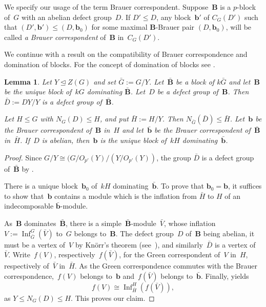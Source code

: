 \documentclass[12pt]{amsart}
\newcommand{\bB}{{\mathbf{B}}}
\newcommand{\bb}{{\mathbf{b}}}
\DeclareMathOperator{\Inf}{Inf}                    %
\newtheorem{lem}[thm]{Lemma}
\theoremstyle{theorem}
\theoremstyle{definition}
\theoremstyle{remark}
\begin{document}
We specify our usage of the term Brauer correspondent. Suppose~$\bB$ is a 
$p$-block of~$G$ with an abelian defect group~$D$. If $D' \leq D$, any 
block~$\bb'$ of $C_G(D')$ such that $(D',\bb') \leq (D,\bb_0)$ for some 
maximal $\bB$-Brauer pair $(D,\bb_0)$, will be called \textit{a Brauer 
correspondent} of~$\bB$ in~$C_G(D')$. 

We continue with a result on the compatibility of Brauer correspondence and 
domination of blocks. For the concept of domination of blocks see 
\cite[Subsection~$5.8.2$]{NaTs}.

\begin{lem}
\label{InflationGreen}
Let $Y \unlhd Z(G)$ and set $\bar{G} := G/Y$. 
Let~$\bar{\bB}$ be a block of $k\bar{G}$ and let~$\bB$ be the unique 
block of~$kG$  dominating $\bar{\bB}$. Let~$D$ be a defect group of~$\bB$.
Then $\bar{D} := DY/Y$ is a defect group of~$\bar{\bB}$.

Let $H \leq G$ with $N_G( D ) \leq H$, and put $\bar{H} := H/Y$. Then
$N_{\bar{G}}(\bar{D}) \leq \bar{H}$.
Let~$\bb$ be the Brauer correspondent of~$\bB$ in~$H$ and let~$\bar{\bb}$ 
be the Brauer correspondent of~$\bar{\bB}$ in~$\bar{H}$. 
If~$D$ is abelian, then~$\bb$ is the unique block of~$kH$ 
dominating~$\bar{\bb}$.
\end{lem}
\begin{proof}
Since $G/Y \cong (G/O_{p'}(Y)/(Y/O_{p'}(Y))$, the group $\bar{D}$ is a defect 
group of~$\bar{\bB}$ by \cite[Theorems~$5.8.8$ and~$5.8.10$]{NaTs}.

There is a unique block~$\bb_{0}$ of~$kH$ 
dominating~$\bar{\bb}$. To prove that $\bb_{0} = \bb$, it suffices to show
that~$\bb$ contains a module which is the inflation from 
$\bar{H}$ to $H$ of an indecomposable 
$\bar{\bb}$-module.
\par
As~$\bB$ dominates~$\bar{\bB}$, there is a simple~$\bar{\bB}$-module~$\bar{V}$, 
whose inflation $V := \Inf_{\bar{G}}^{G}(\bar{V})$ to~$G$ belongs to~$\bB$.
The defect group~$D$ of~$\bB$ being abelian, it must be a vertex of~$V$ by 
Kn\"{o}rr's theorem (see~\cite[Corollary~$3.7$(ii)]{Knoerr79}), and 
similarly~$\bar{D}$ is a vertex of~$\bar{V}$. Write~$f(V)$, 
respectively~$f(\bar{V})$, for the Green correspondent of~$V$ in~$H$, 
respectively of~$\bar{V}$ in~$\bar{H}$. As the Green correspondence 
commutes with the Brauer correspondence,~$f(V)$ belongs to~$\bb$ 
and~$f(\bar{V})$ belongs to~$\bar{\bb}$. Finally, 
\cite[Proposition~$5$]{Harris08} yields
\[
f(V) \cong \Inf_{\bar{H}}^{H}(f(\bar{V})),
\]
as $Y \leq N_G( D ) \leq H$.
This proves our claim.
\end{proof}
\end{document}
